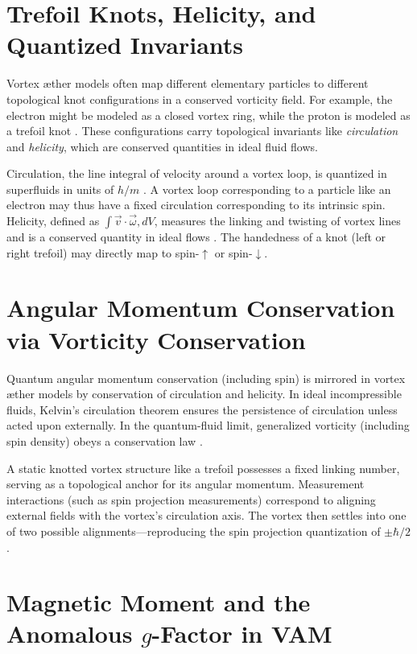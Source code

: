 \section*{Trefoil Knots, Helicity, and Quantized Invariants}

Vortex æther models often map different elementary particles to different topological knot configurations in a conserved vorticity field. For example, the electron might be modeled as a closed vortex ring, while the proton is modeled as a trefoil knot \cite{PhysicsDetectivePair}. These configurations carry topological invariants like \textit{circulation} and \textit{helicity}, which are conserved quantities in ideal fluid flows.


Circulation, the line integral of velocity around a vortex loop, is quantized in superfluids in units of $h/m$ \cite{PRR2021}. A vortex loop corresponding to a particle like an electron may thus have a fixed circulation corresponding to its intrinsic spin. Helicity, defined as $\int \vec{v} \cdot \vec{\omega}, dV$, measures the linking and twisting of vortex lines and is a conserved quantity in ideal flows \cite{PNAS2014}. The handedness of a knot (left or right trefoil) may directly map to spin-$\uparrow$ or spin-$\downarrow$.


\section*{Angular Momentum Conservation via Vorticity Conservation}

Quantum angular momentum conservation (including spin) is mirrored in vortex æther models by conservation of circulation and helicity. In ideal incompressible fluids, Kelvin's circulation theorem ensures the persistence of circulation unless acted upon externally. In the quantum-fluid limit, generalized vorticity (including spin density) obeys a conservation law \cite{PRL2011}.


A static knotted vortex structure like a trefoil possesses a fixed linking number, serving as a topological anchor for its angular momentum. Measurement interactions (such as spin projection measurements) correspond to aligning external fields with the vortex's circulation axis. The vortex then settles into one of two possible alignments—reproducing the spin projection quantization of $\pm \hbar/2$.


\section*{Magnetic Moment and the Anomalous \texorpdfstring{$g$}{g}-Factor in VAM}

